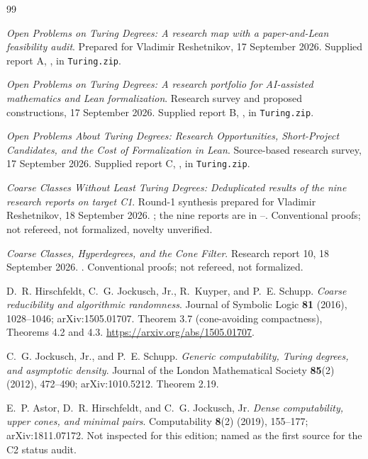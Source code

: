 \documentclass[11pt,a4paper]{article}
\theoremstyle{definition}\newtheorem{definition}[theorem]{Definition}
\theoremstyle{remark}\newtheorem{remark}[theorem]{Remark}
\begin{document}
\begin{thebibliography}{99}
\emph{Open Problems on Turing Degrees: A research map with a paper-and-Lean feasibility audit}. Prepared for Vladimir Reshetnikov, 17 September 2026. Supplied report A, , in \texttt{Turing.zip}.

\emph{Open Problems on Turing Degrees: A research portfolio for AI-assisted mathematics and Lean formalization}. Research survey and proposed constructions, 17 September 2026. Supplied report B, , in \texttt{Turing.zip}.

\emph{Open Problems About Turing Degrees: Research Opportunities, Short-Project Candidates, and the Cost of Formalization in Lean}. Source-based research survey, 17 September 2026. Supplied report C, , in \texttt{Turing.zip}.

\emph{Coarse Classes Without Least Turing Degrees: Deduplicated results of the nine research reports on target C1}. Round-1 synthesis prepared for Vladimir Reshetnikov, 18 September 2026. ; the nine reports are in --. Conventional proofs; not refereed, not formalized, novelty unverified.

\emph{Coarse Classes, Hyperdegrees, and the Cone Filter}. Research report 10, 18 September 2026. . Conventional proofs; not refereed, not formalized.

D.~R. Hirschfeldt, C.~G. Jockusch, Jr., R.~Kuyper, and P.~E. Schupp.
\emph{Coarse reducibility and algorithmic randomness}.
Journal of Symbolic Logic \textbf{81} (2016), 1028--1046; arXiv:1505.01707.
Theorem 3.7 (cone-avoiding compactness), Theorems 4.2 and 4.3.
\url{https://arxiv.org/abs/1505.01707}.

C.~G. Jockusch, Jr., and P.~E. Schupp.
\emph{Generic computability, Turing degrees, and asymptotic density}.
Journal of the London Mathematical Society \textbf{85}(2) (2012), 472--490; arXiv:1010.5212. Theorem 2.19.

E.~P. Astor, D.~R. Hirschfeldt, and C.~G. Jockusch, Jr.
\emph{Dense computability, upper cones, and minimal pairs}.
Computability \textbf{8}(2) (2019), 155--177; arXiv:1811.07172.
Not inspected for this edition; named as the first source for the C2 status audit.


\end{thebibliography}
\end{document}
